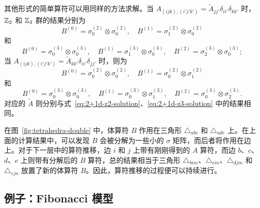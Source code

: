 其他形式的简单算符可以用同样的方法求解。当 $A_{(ijk),(i'j'k')}=\tilde{A}_{jj'}\delta_{ii'}\delta_{kk'}$ 时，$\mathbb{Z}_2$ 和 $\mathbb{Z}_3$ 群的结果分别为
\begin{equation}
  B^{(0)} = \sigma^{(2)}_0 \otimes \sigma^{(2)}_0, \quad
  B^{(1)} = \sigma^{(2)}_1 \otimes \sigma^{(2)}_0
\end{equation}
和
\begin{equation}
  B^{(0)} = \sigma^{(3)}_0 \otimes \sigma^{(3)}_0, \quad
  B^{(1)} = \sigma^{(3)}_1 \otimes \sigma^{(3)}_0, \quad
  B^{(2)} = \sigma^{(3)}_2 \otimes \sigma^{(3)}_0;
\end{equation}
当 $A_{(ijk),(i'j'k')}=\tilde{A}_{kk'}\delta_{ii'}\delta_{jj'}$ 时，则为
\begin{equation}
  B^{(0)} = \sigma^{(2)}_0 \otimes \sigma^{(2)}_0, \quad
  B^{(1)} = \sigma^{(2)}_0 \otimes \sigma^{(2)}_1
\end{equation}
和
\begin{equation}
  B^{(0)} = \sigma^{(3)}_0 \otimes \sigma^{(3)}_0, \quad
  B^{(1)} = \sigma^{(3)}_0 \otimes \sigma^{(3)}_1, \quad
  B^{(2)} = \sigma^{(3)}_0 \otimes \sigma^{(3)}_2.
\end{equation}
对应的 $\tilde{A}$ 则分别与式~\eqref{eq:2+1d-z2-solution}、\eqref{eq:2+1d-z3-solution} 中的结果相同。

在图~\ref{fig:tetrahedra-double} 中，体算符 $B$ 作用在三角形 $\triangle_{abc}$ 和 $\triangle_{ade}$ 上。在上面的计算结果中，可以发现 $B$ 会被分解为一些小的 $\sigma$ 矩阵，而后者将作用在边上。对于下一层中的算符推移，边 $i$ 和 $j$ 上带有刚刚得到的 $A$ 算符，而边 $b$、$c$、$d$、$e$ 上则带有分解后的 $B$ 算符，总的结果相当于三角形 $\triangle_{bim}$、$\triangle_{cin}$、$\triangle_{djm}$ 和 $\triangle_{ejn}$ 放置了新的体算符 $B$。因此，算符推移的过程便可以持续进行。

\subsection{例子：Fibonacci 模型}
\label{subsec:operator-pushing-fib}

